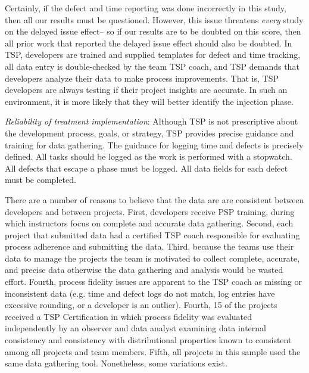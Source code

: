 \documentclass[smallcondensed]{svjour3}
\begin{document}
Certainly, if the defect and time reporting was done
incorrectly in this study, then all our results must be questioned.
However,  this issue threatens {\em every} study on the delayed
issue effect-- so if our results are to be doubted on this score,
then all prior work that reported the delayed issue effect should
also be doubted.  In TSP, developers are trained and supplied templates for defect and time tracking, all data entry is double-checked by the team TSP coach, and TSP demands that developers analyze their data to make process improvements. That is, TSP developers are always testing
if their project insights are accurate. In such an environment,
it is more likely that they will better identify the injection phase.

\textit{Reliability of treatment implementation}: 
Although TSP is not prescriptive about the development process, goals, or strategy, TSP provides precise guidance and training for data gathering. The guidance for logging time and defects is precisely defined. All tasks should be logged as the work is performed with a stopwatch. All defects that escape a phase must be logged. All data fields for each defect must be completed. 

There are a number of reasons to believe that the data are are consistent between developers and between projects. First, developers receive PSP training, during which instructors focus on complete and accurate data gathering. Second, each project that submitted data had a certified TSP coach responsible for evaluating  process adherence and submitting the data. Third, because the teams use their data to manage the projects the team is motivated to collect complete, accurate, and precise data otherwise the data gathering and analysis would be wasted effort. Fourth, process fidelity issues are apparent to the TSP coach as missing or inconsistent data (e.g. time and defect logs do not match, log entries have excessive rounding, or a developer is an outlier). Fourth, 15 of the projects received a TSP Certification in which process fidelity was evaluated independently by an observer and data analyst examining data internal consistency and consistency with  distributional properties known to consistent among all projects and team members. Fifth, all projects in this sample used the same data gathering tool. Nonetheless, some variations exist. 
\end{document}
